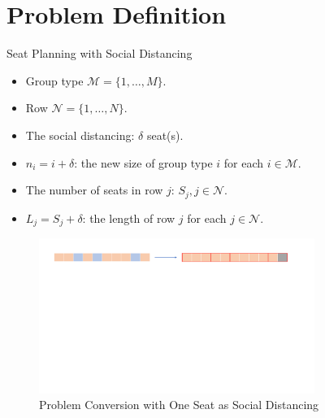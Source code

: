 
\section{Problem Definition}
    \frame{\sectionpage}

    \begin{frame}{Seat Planning with Social Distancing}
      \begin{itemize}
      \item Group type $\mathcal{M} = \{1, \ldots, M\}$.
      \item Row $\mathcal{N} = \{1, \ldots, N\}$.
      \item The social distancing: $\delta$ seat(s).
      \item $n_i = i + \delta$: the new size of group type $i$ for each $i \in \mathcal{M}$.
      \item The number of seats in row $j$: $S_j, j \in \mathcal{N}$.
      \item $L_j = S_j + \delta$: the length of row $j$ for each $j \in \mathcal{N}$.
      \end{itemize}
      
      \begin{figure}[ht]
        \centering
        \includegraphics[width = 0.8\textwidth]{./images/dummy_seat.pdf}
        \caption{Problem Conversion with One Seat as Social Distancing}
    \end{figure}
    \end{frame}


